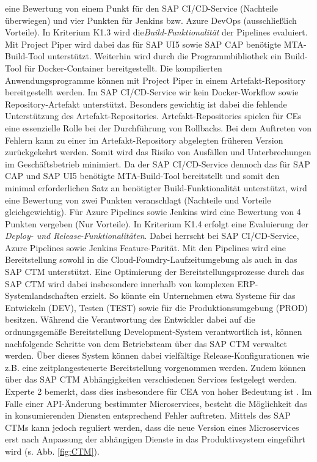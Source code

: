 eine Bewertung von einem Punkt für den SAP CI/CD-Service (Nachteile überwiegen) und vier Punkten für Jenkins bzw. Azure DevOps (ausschließlich Vorteile). In Kriterium K1.3 wird die\textit{Build-Funktionalität} der Pipelines evaluiert. Mit Project Piper wird dabei das für SAP UI5 sowie SAP CAP benötigte MTA-Build-Tool unterstützt. Weiterhin wird durch die Programmbibliothek ein Build-Tool für Docker-Container bereitgestellt.  Die kompilierten Anwendungsprogramme können mit Project Piper in einem Artefakt-Repository bereitgestellt werden. Im SAP CI/CD-Service wir kein Docker-Workflow sowie Repository-Artefakt unterstützt. Besonders gewichtig ist dabei die fehlende Unterstützung des Artefakt-Repositories. Artefakt-Repositories spielen für CEs eine essenzielle Rolle bei der Durchführung von Rollbacks. Bei dem Auftreten von Fehlern kann zu einer im Artefakt-Repository abgelegten früheren Version zurückgekehrt werden. Somit wird das Risiko von Ausfällen und Unterbrechungen im Geschäftsbetrieb minimiert. Da der SAP CI/CD-Service dennoch das für SAP CAP und SAP UI5 benötigte MTA-Build-Tool bereitstellt und somit den minimal erforderlichen Satz an benötigter Build-Funktionalität unterstützt, wird eine Bewertung von zwei Punkten veranschlagt (Nachteile und Vorteile gleichgewichtig). Für Azure Pipelines sowie Jenkins wird eine Bewertung von 4 Punkten vergeben (Nur Vorteile). In Kriterium K1.4 erfolgt eine Evaluierung der \textit{Deploy- und Release-Funktionalitäten}. Dabei herrscht bei SAP CI/CD-Service, Azure Pipelines sowie Jenkins Feature-Parität. Mit den Pipelines wird eine Bereitstellung sowohl in die Cloud-Foundry-Laufzeitumgebung als auch in das SAP CTM unterstützt. Eine Optimierung der Bereitstellungsprozesse durch das SAP CTM wird dabei insbesondere innerhalb von komplexen ERP-Systemlandschaften erzielt. So könnte ein Unternehmen etwa Systeme für das Entwickeln (DEV), Testen (TEST) sowie für die Produktionsumgebung (PROD) besitzen. Während die Verantwortung des Entwickler dabei auf die ordnungsgemäße Bereitstellung Development-System verantwortlich ist, können nachfolgende Schritte von dem Betriebsteam über das SAP CTM verwaltet werden. Über dieses System können dabei vielfältige Release-Konfigurationen wie z.B. eine zeitplangesteuerte Bereitstellung vorgenommen werden. Zudem können über das SAP CTM Abhängigkeiten  verschiedenen Services festgelegt werden. Experte 2 bemerkt, dass dies insbesondere für CEA von hoher Bedeutung ist \cite[Z. 64]{ProductManagerSAPHyperspaceCICD.}. Im Falle einer API-Änderung bestimmter Microservices, besteht die Möglichkeit das in konsumierenden Diensten entsprechend Fehler auftreten. Mittels des SAP CTMs kann jedoch reguliert werden, dass die neue Version eines Microservices erst nach Anpassung der abhängigen Dienste in das Produktivsystem eingeführt wird (s. Abb. \ref*{fig:CTM}).
